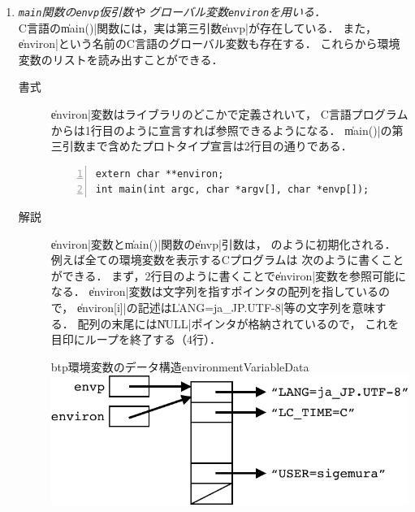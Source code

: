 \begin{enumerate}
\item \emph{\texttt{main}関数の\texttt{envp}仮引数や
  グローバル変数\texttt{environ}を用いる．} \\
  C言語の\|main()|関数には，実は第三引数\|envp|が存在している．
  また，\|environ|という名前のC言語のグローバル変数も存在する．
  これらから環境変数のリストを読み出すことができる．

  \begin{description}
  \item [書式]
    \|environ|変数はライブラリのどこかで定義されいて，
    C言語プログラムからは1行目のように宣言すれば参照できるようになる．
    \|main()|の第三引数まで含めたプロトタイプ宣言は2行目の通りである．

\begin{lstlisting}[numbers=left]
extern char **environ;
int main(int argc, char *argv[], char *envp[]);
\end{lstlisting}

  \item [解説]
    \|environ|変数と\|main()|関数の\|envp|引数は，
    のように初期化される．
    例えば全ての環境変数を表示するCプログラムは
    次のように書くことができる．
    まず，2行目のように書くことで\|environ|変数を参照可能になる．
    \|environ|変数は文字列を指すポインタの配列を指しているので，
    \|environ[i]|の記述は\|LANG=ja_JP.UTF-8|等の文字列を意味する．
    配列の末尾には\|NULL|ポインタが格納されているので，
    これを目印にループを終了する（4行）．

    \begin{myfig}{btp}{環境変数のデータ構造}{environmentVariableData}
      \includegraphics[scale=0.8]{Fig/environmentVariableData-crop.pdf}
    \end{myfig}

    
  \end{description}


\end{enumerate}
